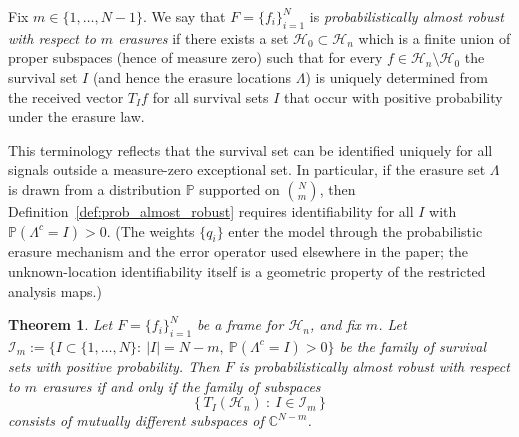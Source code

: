 \documentclass[final,1p,times]{elsarticle}
\newtheorem{thm}{Theorem}[section]
\begin{document}
\begin{defn}
\label{def:prob_almost_robust}
Fix $m\in\{1,\dots,N-1\}$.
We say that $F=\{f_i\}_{i=1}^N$ is \emph{probabilistically almost robust with respect to $m$ erasures}  if there exists a set $\mathcal H_0\subset\mathcal H_n$ which is a finite union of
proper subspaces (hence of measure zero) such that for every $f\in\mathcal H_n\setminus\mathcal H_0$ the survival set $I$
(and hence the erasure locations $\Lambda$) is uniquely determined from the received vector $T_I f$ for all survival sets $I$
that occur with positive probability under the erasure law.
\end{defn}
This terminology reflects that the survival set can be identified uniquely for all signals outside a measure-zero exceptional set.
\noindent
In particular, if the erasure set $\Lambda$ is drawn from a distribution $\mathbb P$ supported on $\binom{N}{m}$,
then Definition~\ref{def:prob_almost_robust} requires identifiability for all $I$ with $\mathbb P(\Lambda^c=I)>0$.
(The weights $\{q_i\}$ enter the model through the probabilistic erasure mechanism and the error operator used elsewhere
in the paper; the unknown-location identifiability itself is a geometric property of the restricted analysis maps.)

\begin{thm}
\label{thm:prob_robust_characterization}
Let $F=\{f_i\}_{i=1}^N$ be a frame for $\mathcal H_n$, and fix $m$.
Let $\mathcal I_{m}:=\{I\subset\{1,\dots,N\}:\ |I|=N-m,\ \mathbb P(\Lambda^c=I)>0\}$ be the family of survival sets with
positive probability.
Then $F$ is probabilistically almost robust with respect to $m$ erasures if and only if the family of subspaces
\[
\big\{\,T_I(\mathcal H_n)\ :\ I\in\mathcal I_m\,\big\}
\]
consists of mutually different subspaces of $\mathbb C^{N-m}$.
\end{thm}
\end{document}

